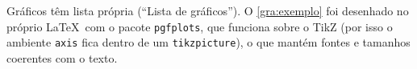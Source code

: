 Gráficos têm lista própria (``Lista de gráficos''). O \autoref{gra:exemplo} foi
desenhado no próprio \LaTeX\ com o pacote \texttt{pgfplots}, que funciona sobre o TikZ
(por isso o ambiente \texttt{axis} fica dentro de um \texttt{tikzpicture}), o que mantém
fontes e tamanhos coerentes com o texto.

\begin{grafico}[htbp]
  \begin{ilustracao}{\caption{Tempo médio de resposta por implementação}\label{gra:exemplo}}{\elaboracaopropria{}}
  \end{ilustracao}
\end{grafico}
